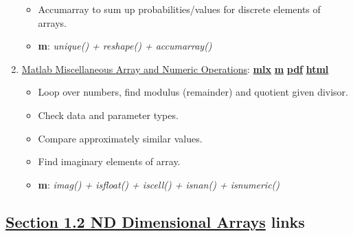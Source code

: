 \documentclass[
]{book}
\providecommand{\tightlist}{%
  \setlength{\itemsep}{0pt}\setlength{\parskip}{0pt}}
\begin{document}
\begin{enumerate}
  \begin{itemize}
  \tightlist
  \item
    Accumarray to sum up probabilities/values for discrete elements of arrays.
  \item
    \textbf{m}: \emph{unique() + reshape() + accumarray()}
  \end{itemize}
\item
  \href{https://fanwangecon.github.io/M4Econ/amto/array/htmlpdfm/fs_img.html}{Matlab Miscellaneous Array and Numeric Operations}: \href{https://github.com/FanWangEcon/M4Econ/blob/master/amto/array/fs_img.mlx}{\textbf{mlx}} \textbar{} \href{https://github.com/FanWangEcon/M4Econ/blob/master/amto/array/htmlpdfm/fs_img.m}{\textbf{m}} \textbar{} \href{https://github.com/FanWangEcon/M4Econ/blob/master/amto/array/htmlpdfm/fs_img.pdf}{\textbf{pdf}} \textbar{} \href{https://fanwangecon.github.io/M4Econ/amto/array/htmlpdfm/fs_img.html}{\textbf{html}}

  \begin{itemize}
  \tightlist
  \item
    Loop over numbers, find modulus (remainder) and quotient given divisor.
  \item
    Check data and parameter types.
  \item
    Compare approximately similar values.
  \item
    Find imaginary elements of array.
  \item
    \textbf{m}: \emph{imag() + isfloat() + iscell() + isnan() + isnumeric()}
  \end{itemize}
\end{enumerate}

\hypertarget{section-1.2-nd-dimensional-arraysnd-dimensional-arrays-links}{%
\subsection{\texorpdfstring{\protect\hyperlink{nd-dimensional-arrays}{Section 1.2 ND Dimensional Arrays} links}{Section 1.2 ND Dimensional Arrays links}}\label{section-1.2-nd-dimensional-arraysnd-dimensional-arrays-links}}
\end{document}
